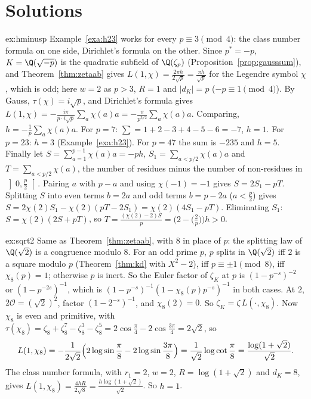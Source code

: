 \section{Solutions}

\begin{solution}{ex:hminusp}
\idea Example~\ref{exa:h23} works for every $p\equiv3\pmod4$: the class number formula on one side, Dirichlet's formula on the other.
\writeup Since $p^*=-p$, $K=\Q(\sqrt{-p})$ is the quadratic subfield of $\Q(\zeta_p)$ (Proposition~\ref{prop:gausssum}), and Theorem~\ref{thm:zetaab}
gives $L(1,\chi)=\frac{2\pi h}{2\sqrt p}=\frac{\pi h}{\sqrt p}$ for the Legendre symbol $\chi$, which is odd; here $w=2$ as $p>3$, $R=1$ and $|d_K|=p$
($-p\equiv1\pmod4$). By Gauss, $\tau(\chi)=i\sqrt p$, and Dirichlet's formula gives $L(1,\chi)=-\frac{i\pi}{p\cdot i\sqrt p}\sum_a\chi(a)a=
-\frac\pi{p^{3/2}}\sum_a\chi(a)a$. Comparing, $h=-\frac1p\sum_a\chi(a)a$. For $p=7$: $\sum=1+2-3+4-5-6=-7$, $h=1$. For $p=23$: $h=3$
(Example~\ref{exa:h23}). For $p=47$ the sum is $-235$ and $h=5$. Finally let $S=\sum_{a=1}^{p-1}\chi(a)a=-ph$, $S_1=\sum_{a<p/2}\chi(a)a$ and
$T=\sum_{a<p/2}\chi(a)$, the number of residues minus the number of non-residues in $\left]0,\frac p2\right[$. Pairing $a$ with $p-a$ and using
$\chi(-1)=-1$ gives $S=2S_1-pT$. Splitting $S$ into even terms $b=2a$ and odd terms $b=p-2a$ ($a<\frac p2$) gives $S=2\chi(2)S_1-\chi(2)(pT-2S_1)
=\chi(2)(4S_1-pT)$. Eliminating $S_1$: $S=\chi(2)(2S+pT)$, so $T=\frac{(\chi(2)-2)S}p=\bigl(2-\bigl(\frac2p\bigr)\bigr)h>0$.
\end{solution}

\begin{solution}{ex:sqrt2}
\idea Same as Theorem~\ref{thm:zetaab}, with $8$ in place of $p$: the splitting law of $\Q(\sqrt2)$ is a congruence modulo $8$.
\writeup For an odd prime $p$, $p$ splits in $\Q(\sqrt2)$ iff $2$ is a square modulo $p$ (Theorem~\ref{thm:kd} with $X^2-2$), iff $p\equiv\pm1
\pmod8$, iff $\chi_8(p)=1$; otherwise $p$ is inert. So the Euler factor of $\zeta_K$ at $p$ is $(1-p^{-s})^{-2}$ or $(1-p^{-2s})^{-1}$, which is
$(1-p^{-s})^{-1}(1-\chi_8(p)p^{-s})^{-1}$ in both cases. At $2$, $2\mathcal O=(\sqrt2)^2$, factor $(1-2^{-s})^{-1}$, and $\chi_8(2)=0$. So
$\zeta_K=\zeta\,L(\cdot,\chi_8)$. Now $\chi_8$ is even and primitive, with $\tau(\chi_8)=\zeta_8+\zeta_8^7-\zeta_8^3-\zeta_8^5=2\cos\frac\pi4-2\cos
\frac{3\pi}4=2\sqrt2$, so
\[
L(1,\chi_8)=-\frac1{2\sqrt2}\Bigl(2\log\sin\frac\pi8-2\log\sin\frac{3\pi}8\Bigr)=\frac1{\sqrt2}\log\cot\frac\pi8=\frac{\log(1+\sqrt2)}{\sqrt2}.
\]
The class number formula, with $r_1=2$, $w=2$, $R=\log(1+\sqrt2)$ and $d_K=8$, gives $L(1,\chi_8)=\frac{4hR}{2\sqrt8}=\frac{h\log(1+\sqrt2)}{\sqrt2}$.
So $h=1$.
\end{solution}


